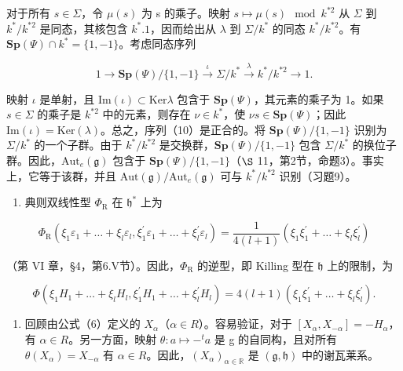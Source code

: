 对于所有 \(s \in \Sigma\)，令 \(\mu(s)\) 为 s 的乘子。映射 \(s \mapsto \mu(s) \mod k^{*2}\) 从 \(\Sigma\) 到 \(k^{*}/k^{*2}\) 是同态，其核包含 \(k^{*}.1\)，因而给出从 \(\lambda\) 到 \(\Sigma/k^{*}\) 的同态 \(k^{*}/k^{*2}\)。有 \(\mathbf{Sp}(\varPsi) \cap k^{*} = \{1, -1\}\)。考虑同态序列

\[
1 \longrightarrow \mathbf {S p} (\Psi) / \{1, - 1 \} \stackrel {{\iota}} {{\longrightarrow}} \Sigma / k ^ {*} \stackrel {{\lambda}} {{\longrightarrow}} k ^ {*} / k ^ {* 2} \longrightarrow 1.\tag{10}
\]

映射 \(\iota\) 是单射，且 \(\mathrm{Im}(\iota) \subset \mathrm{Ker}\lambda\) 包含于 \(\mathbf{Sp}(\varPsi)\)，其元素的乘子为 1。如果 \(s \in \varSigma\) 的乘子是 \(k^{*2}\) 中的元素，则存在 \(\nu \in k^*\)，使 \(\nu s \in \mathbf{Sp}(\varPsi)\)；因此 \(\mathrm{Im}(\iota) = \mathrm{Ker}(\lambda)\)。总之，序列（10）是正合的。将 \(\mathbf{Sp}(\varPsi)/\{1, -1\}\) 识别为 \(\varSigma/k^*\) 的一个子群。由于 \(k^*/k^{*2}\) 是交换群，\(\mathbf{Sp}(\varPsi)/\{1, -1\}\) 包含 \(\varSigma/k^*\) 的换位子群。因此，\(\mathrm{Aut}_e(\mathfrak{g})\) 包含于 \(\mathbf{Sp}(\varPsi)/\{1, -1\}\)（\(\S\) 11，第2节，命题3）。事实上，它等于该群，并且 \(\mathrm{Aut}(\mathfrak{g})/\mathrm{Aut}_e(\mathfrak{g})\) 可与 \(k^*/k^{*2}\) 识别（习题9）。

\begin{enumerate}
\def\labelenumi{(\Roman{enumi})}
\setcounter{enumi}{7}
\tightlist
\item
典则双线性型 \(\Phi_{\mathrm{R}}\) 在 \(\mathfrak{h}^*\) 上为
\end{enumerate}

\[
\varPhi_ {\mathrm{R}} (\xi_ {1} \varepsilon_ {1} + \dots + \xi_ {l} \varepsilon_ {l}, \xi_ {1} ^ {\prime} \varepsilon_ {1} + \dots + \xi_ {l} ^ {\prime} \varepsilon_ {l}) = \frac {1}{4 (l + 1)} (\xi_ {1} \xi_ {1} ^ {\prime} + \dots + \xi_ {l} \xi_ {l} ^ {\prime})
\]

（第 VI 章，§4，第6.V节）。因此，\(\varPhi_{\mathrm{R}}\) 的逆型，即 Killing 型在 \(\mathfrak{h}\) 上的限制，为

\[
\Phi (\xi_ {1} H _ {1} + \dots + \xi_ {l} H _ {l}, \xi_ {1} ^ {\prime} H _ {1} + \dots + \xi_ {l} ^ {\prime} H _ {l}) = 4 (l + 1) (\xi_ {1} \xi_ {1} ^ {\prime} + \dots + \xi_ {l} \xi_ {l} ^ {\prime}).
\]

\begin{enumerate}
\def\labelenumi{(\Roman{enumi})}
\setcounter{enumi}{8}
\tightlist
\item
回顾由公式（6）定义的 \(X_{\alpha}\)（\(\alpha \in R\)）。容易验证，对于 \([X_{\alpha}, X_{-\alpha}] = -H_{\alpha}\)，有 \(\alpha \in R\)。另一方面，映射 \(\theta : a \mapsto -^{t}a\) 是 g 的自同构，且对所有 \(\theta(X_{\alpha}) = X_{-\alpha}\) 有 \(\alpha \in R\)。因此，\((X_{\alpha})_{\alpha \in \mathbb{R}}\) 是 \((\mathfrak{g}, \mathfrak{h})\) 中的谢瓦莱系。
\end{enumerate}

